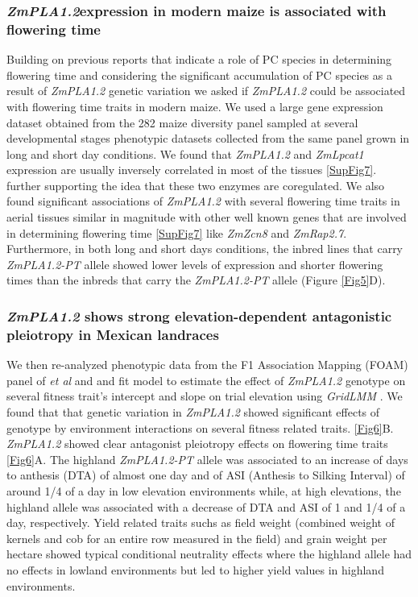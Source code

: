 \documentclass[9pt,twocolumn,twoside]{BioRxiv}
\begin{document}
\subsubsection{\textit{ZmPLA1.2}expression in modern maize is associated with flowering time}
Building on previous reports that indicate a role of PC species in determining flowering time \cite{Nakamura2014-qf, Riedelsheimer2013-bd} and considering the significant accumulation of PC species as a result of \textit{ZmPLA1.2} genetic variation we asked if \textit{ZmPLA1.2} could be associated with flowering time traits in modern maize. 
We used a large gene expression dataset obtained from the 282 maize diversity panel sampled at several developmental stages \cite{Kremling2018-gn} phenotypic datasets collected from the same panel grown in long and short day conditions. 
We found that \textit{ZmPLA1.2} and \textit{ZmLpcat1} expression are usually inversely correlated in most of the tissues \ref{SupFig7}. further supporting the idea that these two enzymes are coregulated. 
We also found significant associations of \textit{ZmPLA1.2} with several flowering time traits in aerial tissues similar in magnitude with other well known genes that are involved in determining flowering time \ref{SupFig7} like \textit{ZmZcn8} and \textit{ZmRap2.7}.
Furthermore, in both long and short days conditions, the inbred lines that carry \textit{ZmPLA1.2-PT} allele showed lower levels of expression and shorter flowering times than the inbreds that carry the \textit{ZmPLA1.2-PT} allele  (Figure \ref{Fig5}D). 

\subsubsection{\textit{ZmPLA1.2} shows strong elevation-dependent antagonistic pleiotropy in Mexican landraces}
We then re-analyzed phenotypic data from the F1 Association Mapping (FOAM) panel of \textit{et al} \cite{Romero_Navarro2017-cn} and \cite{Gates2019-xu} and fit model to estimate the effect of \textit{ZmPLA1.2} genotype on several fitness trait's intercept and slope on trial elevation using \textit{GridLMM} \cite{Runcie2019-Gr}. We found that that genetic variation in \textit{ZmPLA1.2} showed significant effects of genotype by environment interactions on several fitness related traits. \ref{Fig6}B. 
\textit{ZmPLA1.2} showed clear antagonist pleiotropy effects on flowering time traits \ref{Fig6}A. 
The highland \textit{ZmPLA1.2-PT} allele was associated to an increase of days to anthesis (DTA) of almost one day and of ASI (Anthesis to Silking Interval) of around 1/4 of a day in low elevation environments while, at high elevations, the highland allele was associated with a decrease of DTA and ASI of 1 and 1/4 of a day, respectively.
Yield related traits suchs as field weight (combined weight of kernels and cob for an entire row measured in the field) and grain weight per hectare showed typical conditional neutrality effects where the highland allele had no effects in lowland environments but led to higher yield values in highland environments.
\end{document}
